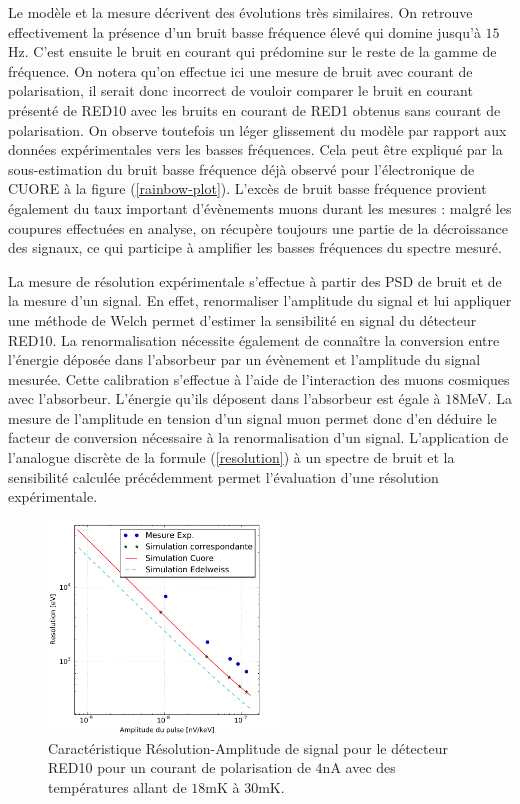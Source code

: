 Le modèle et la mesure décrivent des évolutions très similaires. On retrouve effectivement la présence d'un bruit basse fréquence élevé qui domine jusqu'à $15$Hz. C'est ensuite le bruit en courant qui prédomine sur le reste de la gamme de fréquence. On notera qu'on effectue ici une mesure de bruit avec courant de polarisation, il serait donc incorrect de vouloir comparer le bruit en courant présenté de RED10 avec les bruits en courant de RED1 obtenus sans courant de polarisation. On observe toutefois un léger glissement du modèle par rapport aux données expérimentales vers les basses fréquences. Cela peut être expliqué par la sous-estimation du bruit basse fréquence déjà observé pour l'électronique de CUORE à la figure (\ref{rainbow-plot}). L'excès de bruit basse fréquence provient également du taux important d'évènements muons durant les mesures : malgré les coupures effectuées en analyse, on récupère toujours une partie de la décroissance des signaux, ce qui participe à amplifier les basses fréquences du spectre mesuré.

La mesure de résolution expérimentale s'effectue à partir des PSD de bruit et de la mesure d'un signal. En effet, renormaliser l'amplitude du signal et lui appliquer une méthode de Welch permet d'estimer la sensibilité en signal du détecteur RED10. La renormalisation nécessite également de connaître la conversion entre l'énergie déposée dans l'absorbeur par un évènement et l'amplitude du signal mesurée. Cette calibration s'effectue à l'aide de l'interaction des muons cosmiques avec l'absorbeur. L'énergie qu'ils déposent dans l'absorbeur est égale à $18$MeV. La mesure de l'amplitude en tension d'un signal muon permet donc d'en déduire le facteur de conversion nécessaire à la renormalisation d'un signal. L'application de l'analogue discrète de la formule (\ref{resolution}) à un spectre de bruit et la sensibilité calculée précédemment  permet l'évaluation d'une résolution expérimentale. 

\begin{figure}[!ht]
\begin{center}
\includegraphics[width=0.55\textwidth]{Images/resamp_fin_fin.pdf}
\end{center}
\caption{Caractéristique Résolution-Amplitude de signal pour le détecteur RED10 pour un courant de polarisation de $4$nA avec des températures allant de $18$mK à $30$mK.}
\label{amp-res-red10}
\end{figure}

